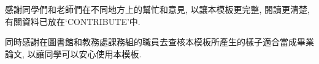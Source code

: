 \StartAcknowledgmentsChi

感謝同學們和老師們在不同地方上的幫忙和意見, 以讓本模板更完整, 閱讀更清楚, 有關資料已放在`CONTRIBUTE'中.

同時感謝在圖書館和教務處課務組的職員去查核本模板所產生的樣子適合當成畢業論文, 以讓同學可以安心使用本模板.

\EndAcknowledgments
